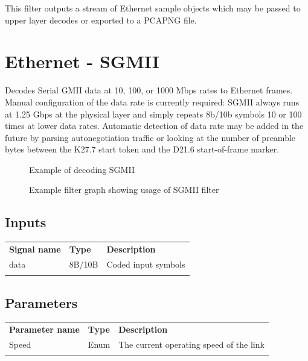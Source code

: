 This filter outputs a stream of Ethernet sample objects which may be passed to upper layer decodes or exported to a
PCAPNG file.

\pagebreak
\section{Ethernet - SGMII}
\label{filter:sgmii}

Decodes Serial GMII data at 10, 100, or 1000 Mbps rates to Ethernet frames. Manual configuration of the data rate is
currently required: SGMII always runs at 1.25 Gbps at the physical layer and simply repeats 8b/10b symbols 10 or 100
times at lower data rates. Automatic detection of data rate may be added in the future by parsing autonegotiation
traffic or looking at the number of preamble bytes between the K27.7 start token and the D21.6 start-of-frame marker.

\begin{figure}[h]
\centering
{}
\caption{Example of decoding SGMII}
\label{filter_sgmii}
\end{figure}

\begin{figure}[h]
\centering
{}
\caption{Example filter graph showing usage of SGMII filter}
\label{filter_sgmii}
\end{figure}

\FloatBarrier

\subsection{Inputs}

\begin{tabularx}{16cm}{llX}
\thickhline
\textbf{Signal name} & \textbf{Type} & \textbf{Description} \\
\thickhline
data & 8B/10B & Coded input symbols\\
\thickhline
\end{tabularx}

\subsection{Parameters}

\begin{tabularx}{16cm}{llX}
\thickhline
\textbf{Parameter name} & \textbf{Type} & \textbf{Description} \\
\thickhline
Speed & Enum & The current operating speed of the link\\
\thickhline
\end{tabularx}

